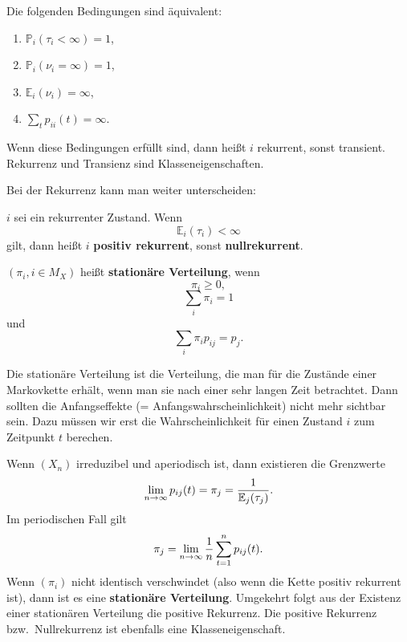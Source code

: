 \begin{satz}
Die folgenden Bedingungen sind äquivalent:
\begin{enumerate}
\item $\mathbb P_i(\tau_i<\infty)=1$,
\item $\mathbb P_i(\nu_i=\infty)=1$,
\item $\mathbb E_i(\nu_i)=\infty$,
\item $\sum_tp_{ii}(t)=\infty$.
\end{enumerate}
Wenn diese Bedingungen erfüllt sind, dann heißt $i$ rekurrent, sonst
transient. Rekurrenz und Transienz sind Klasseneigenschaften.
\end{satz}

Bei der Rekurrenz kann man weiter unterscheiden:
\begin{definition}
$i$ sei ein rekurrenter Zustand. Wenn 
\[\mathbb E_i(\tau_i)<\infty\]
gilt, dann heißt $i$ \textbf{positiv rekurrent}, sonst \textbf{nullrekurrent}.
\end{definition}

\begin{definition}
$(\pi_i, i\in M_X)$ heißt \textbf{stationäre Verteilung}, wenn
\[\pi_i\ge 0,\]
\[\sum_i\pi_i=1\]
und
\[\sum_i \pi_ip_{ij}=p_j.\]

Die stationäre Verteilung ist die Verteilung, die man für die Zustände
einer Markovkette erhält, wenn man sie nach einer sehr langen Zeit betrachtet. Dann sollten die Anfangseffekte (= Anfangswahrscheinlichkeit)
nicht mehr sichtbar sein. Dazu müssen wir erst die Wahrscheinlichkeit für
einen Zustand $i$ zum Zeitpunkt $t$ berechen.
\end{definition}

\begin{satz}
Wenn $(X_n)$ irreduzibel und aperiodisch ist, dann existieren die
Grenzwerte
\[\lim_{n\to\infty}p_{ij}(t)=\pi_j={1\over \mathbb E_j(\tau_j)}.\]
Im periodischen Fall gilt
\[\pi_j=\lim_{n\to\infty}{1\over n}\sum_{t=1}^{n}p_{ij}(t).\]
Wenn $(\pi_i)$ nicht identisch verschwindet (also wenn die Kette positiv
rekurrent ist), dann ist es eine
\textbf{stationäre Verteilung}. Umgekehrt folgt aus der Existenz
einer stationären Verteilung die positive Rekurrenz. Die positive Rekurrenz
bzw.\ Nullrekurrenz ist ebenfalls eine Klasseneigenschaft.
\end{satz}

